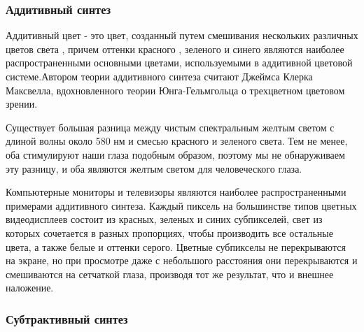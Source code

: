 \subsubsection{Аддитивный синтез}
Аддитивный цвет - это цвет, созданный путем смешивания нескольких различных цветов света , причем оттенки красного , зеленого и синего являются наиболее распространенными основными цветами, используемыми в аддитивной цветовой системе.Автором теории аддитивного синтеза считают Джеймса Клерка Максвелла, вдохновленного теории Юнга-Гельмгольца о трехцветном цветовом зрении.

Существует большая разница между чистым спектральным желтым светом с длиной волны около 580 нм и смесью красного и зеленого света. Тем не менее, оба стимулируют наши глаза подобным образом, поэтому мы не обнаруживаем эту разницу, и оба являются желтым светом для человеческого глаза. 

\begin{figure}[ht!]
\end{figure}

Компьютерные мониторы и телевизоры являются наиболее распространенными примерами аддитивного синтеза. Каждый пиксель на большинстве типов цветных видеодисплеев состоит из красных, зеленых и синих субпикселей, свет из которых сочетается в разных пропорциях, чтобы производить все остальные цвета, а также белые и оттенки серого. Цветные субпикселы не перекрываются на экране, но при просмотре даже с небольшого  расстояния они перекрываются и смешиваются на сетчаткой глаза, производя тот же результат, что и внешнее наложение.


\subsubsection{Субтрактивный синтез}
